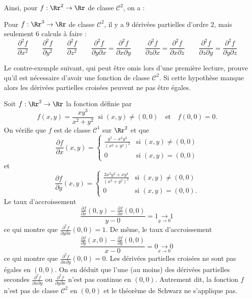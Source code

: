 \documentclass[11pt, class=report,crop=false]{standalone}
\begin{document}
Ainsi, pour $f : \Rr^2 \to \Rr$ de classe $\mathcal{C}^2$, on a :

Pour $f : \Rr^3 \to \Rr$ de classe $\mathcal{C}^2$, il y a $9$ dérivées partielles d'ordre $2$, mais seulement $6$ calculs à faire :
 $$\frac{\partial ^2 f}{\partial x^2}
 \qquad
 \frac{\partial ^2 f}{\partial y^2}
 \qquad
 \frac{\partial ^2 f}{\partial z^2}  
 \qquad 
 \frac{\partial ^2 f}{\partial y\partial x}= \frac{\partial ^2 f}{\partial x\partial y}
 \qquad
 \frac{\partial ^2 f}{\partial z\partial x}= \frac{\partial ^2 f}{\partial x\partial z}
 \qquad
 \frac{\partial ^2 f}{\partial z\partial y}= \frac{\partial ^2 f}{\partial y\partial z} 
 $$


Le contre-exemple suivant, qui peut être omis lors d'une première lecture, prouve qu'il est nécessaire d'avoir une fonction de classe $\mathcal{C}^2$. Si cette hypothèse manque alors les dérivées partielles croisées peuvent ne pas être égales.

\begin{exemple}
Soit $f: \Rr^2 \to \Rr$ la fonction définie par
$$f(x,y)=\frac{xy^3}{x^2+y^2}\;\mbox{ si }(x,y)\neq (0,0)\quad \mbox{et}\quad f(0,0)= 0.$$
On vérifie que $f$ est de classe $\mathcal{C}^1$ sur $\Rr^2$ et que
$$\frac{\partial f}{\partial x}(x,y)=\left\{\begin{array}{cl}\displaystyle \frac{y^5-x^2y^3}{(x^2+y^2)^2}&\mbox{si }(x,y)\neq (0,0)\\ 0&\mbox{si }(x,y)=(0,0)
\end{array}\right.$$
et 
$$\frac{\partial f}{\partial y}(x,y)=\left\{\begin{array}{cl}\displaystyle \frac{3x^3y^2+xy^4}{(x^2+y^2)^2}&\mbox{si }(x,y)\neq (0,0)\\ 0&\mbox{si }(x,y)=(0,0).\end{array}\right.$$
Le taux d'accroissement
$$\frac{\frac{\partial f}{\partial x}(0,y)-\frac{\partial f}{\partial x}(0,0)}{y-0}=1\underset{y\to 0\; \; \; }{\longrightarrow 1}$$
ce qui montre que $\displaystyle \frac{\partial ^2f}{\partial y\partial x}(0,0)=1$.
De même, le taux d'accroissement
$$\frac{\frac{\partial f}{\partial y}(x,0)-\frac{\partial f}{\partial y}(0,0)}{x-0}=0\underset{x\to 0\; \; \; }{\longrightarrow 0}$$
ce qui montre que $\displaystyle \frac{\partial ^2f}{\partial x\partial y}(0,0)=0$. 
Les dérivées partielles croisées ne sont pas égales en $(0,0)$.
On en déduit que l'une (au moins) des dérivées partielles secondes $\displaystyle \frac{\partial ^2f}{\partial x\partial y}$ ou $\displaystyle \frac{\partial ^2f}{\partial y\partial x}$ n'est pas continue en $(0,0)$. Autrement dit, la fonction $f$ n'est pas de classe $\mathcal{C}^2$ en $(0,0)$ et le théorème de Schwarz ne s'applique pas.
\end{exemple}
\end{document}
